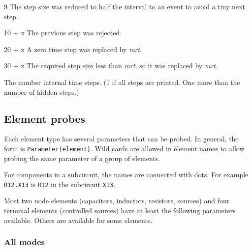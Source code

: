 \begin{description}
\begin{description}
\item{9} The step size was reduced to half the interval to an event 
to avoid a tiny next step.

\item{10 + x} The previous step was rejected.

\item{20 + x} A zero time step was replaced by {\it mrt}.

\item{30 + x} The required step size less than {\it mrt}, so it was 
replaced by {\it mrt}.

\end{description}

\item[{\tt Control(1)}] The number internal time steps.  (1 if all steps are
printed.  One more than the number of hidden steps.)

\end{description}
\subsection{Element probes}

Each element type has several parameters that can be probed.  In general,
the form is {\tt Parameter(element)}.  Wild cards are allowed in element
names to allow probing the same parameter of a group of elements.

For components in a subcircuit, the names are connected with dots.  For
example {\tt R12.X13} is {\tt R12} in the subcircuit {\tt X13}.

Most two node elements (capacitors, inductors, resistors, sources) and
four terminal elements (controlled sources) have at least the
following parameters available.  Others are available for some
elements.
\subsubsection{All modes}

